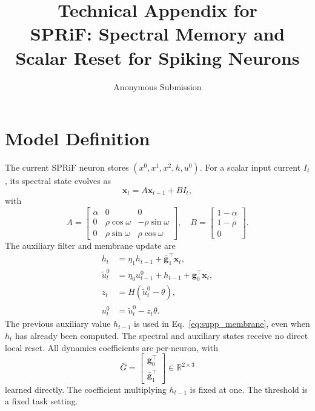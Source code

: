 \documentclass[letterpaper]{article}
\title{Technical Appendix for\\SPRiF: Spectral Memory and Scalar Reset for Spiking Neurons}
\author{Anonymous Submission}
\date{}
\begin{document}
\maketitle

\section{Model Definition}

The current SPRiF neuron stores $(x^0,x^1,x^2,h,u^0)$. For a scalar input current $I_t$, its spectral state evolves as
\begin{equation}
\mathbf{x}_t=A\mathbf{x}_{t-1}+BI_t,
\label{eq:supp_slow}
\end{equation}
with
\begin{equation}
A=\begin{bmatrix}
\alpha&0&0\\
0&\rho\cos\omega&-\rho\sin\omega\\
0&\rho\sin\omega&\rho\cos\omega
\end{bmatrix},\quad
B=\begin{bmatrix}1-\alpha\\1-\rho\\0\end{bmatrix}.
\label{eq:supp_AB}
\end{equation}
The auxiliary filter and membrane update are
\begin{align}
h_t&=\eta_1h_{t-1}+\bar{\mathbf{g}}_1^\top\mathbf{x}_t,
\label{eq:supp_auxiliary}\\
\widetilde{u}_t^0&=\eta_0u_{t-1}^0+h_{t-1}+\mathbf{g}_0^\top\mathbf{x}_t,
\label{eq:supp_membrane}\\
z_t&=H(\widetilde{u}_t^0-\theta),
\label{eq:supp_spike}\\
u_t^0&=\widetilde{u}_t^0-z_t\theta.
\label{eq:supp_reset}
\end{align}
The previous auxiliary value $h_{t-1}$ is used in Eq.~\eqref{eq:supp_membrane}, even when $h_t$ has already been computed. The spectral and auxiliary states receive no direct local reset. All dynamics coefficients are per-neuron, with
\begin{equation}
\bar G=\begin{bmatrix}\mathbf{g}_0^\top\\\bar{\mathbf{g}}_1^\top\end{bmatrix}\in\mathbb{R}^{2\times3}
\label{eq:supp_readout}
\end{equation}
learned directly. The coefficient multiplying $h_{t-1}$ is fixed at one. The threshold is a fixed task setting.
\end{document}
